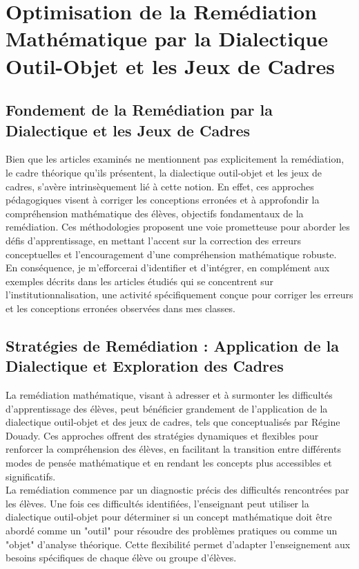 \section{Optimisation de la Remédiation Mathématique par la Dialectique Outil-Objet et les Jeux de Cadres}

\subsection{Fondement de la Remédiation par la Dialectique et les Jeux de Cadres}

Bien que les articles examinés ne mentionnent pas explicitement la remédiation,
le cadre théorique qu'ils présentent,
la dialectique outil-objet et les jeux de cadres,
s'avère intrinsèquement lié à cette notion.
En effet,
ces approches pédagogiques visent à corriger les conceptions erronées et à approfondir la compréhension mathématique des élèves,
objectifs fondamentaux de la remédiation.
Ces méthodologies proposent une voie prometteuse pour aborder les défis d'apprentissage,
en mettant l'accent sur la correction des erreurs conceptuelles et l'encouragement d'une compréhension mathématique robuste.\\

En conséquence,
je m'efforcerai d'identifier et d'intégrer,
en complément aux exemples décrits dans les articles étudiés qui se concentrent sur l'institutionnalisation,
une activité spécifiquement conçue pour corriger les erreurs et les conceptions erronées observées dans mes classes.

\subsection{Stratégies de Remédiation : Application de la Dialectique et Exploration des Cadres}

La remédiation mathématique,
visant à adresser et à surmonter les difficultés d'apprentissage des élèves,
peut bénéficier grandement de l'application de la dialectique outil-objet et des jeux de cadres,
tels que conceptualisés par Régine Douady.
Ces approches offrent des stratégies dynamiques et flexibles pour renforcer la compréhension des élèves,
en facilitant la transition entre différents modes de pensée mathématique et en rendant les concepts plus accessibles et significatifs.\\

La remédiation commence par un diagnostic précis des difficultés rencontrées par les élèves.
Une fois ces difficultés identifiées,
l'enseignant peut utiliser la dialectique outil-objet pour déterminer si un concept mathématique doit être abordé comme un "outil" pour résoudre des problèmes pratiques ou comme un "objet" d'analyse théorique.
Cette flexibilité permet d'adapter l'enseignement aux besoins spécifiques de chaque élève ou groupe d'élèves.\\

